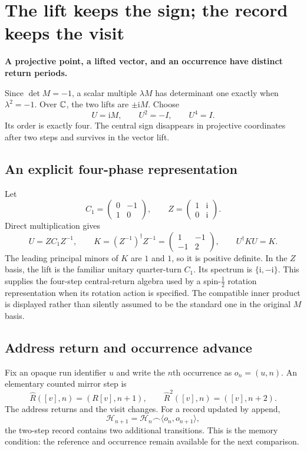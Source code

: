 \documentclass[11pt]{article}
\theoremstyle{definition}\newtheorem{definition}[theorem]{Definition}
\newcommand{\mi}{\mathrm i}\newcommand{\tr}{\mathsf T}
\newcommand{\lead}[1]{\textbf{#1}\par}
\newcommand{\page}{\clearpage}
\begin{document}
\page
\section{The lift keeps the sign; the record keeps the visit}
\lead{A projective point, a lifted vector, and an occurrence have distinct return periods.}
Since $\det M=-1$, a scalar multiple $\lambda M$ has determinant one exactly when $\lambda^2=-1$. Over $\mathbb C$, the two lifts are $\pm\mi M$. Choose
\begin{equation}
 U=\mi M,\qquad U^2=-I,\qquad U^4=I.
 \label{eq:lift}
\end{equation}
Its order is exactly four. The central sign disappears in projective coordinates after two steps and survives in the vector lift.

\subsection{An explicit four-phase representation}
Let
\begin{equation}
 C_1=\begin{pmatrix}0&-1\\1&0\end{pmatrix},\qquad
 Z=\begin{pmatrix}1&\mi\\0&\mi\end{pmatrix}.
\end{equation}
Direct multiplication gives
\begin{equation}
 U=ZC_1Z^{-1},\qquad
 K=(Z^{-1})^\dagger Z^{-1}=\begin{pmatrix}1&-1\\-1&2\end{pmatrix},
 \qquad U^\dagger K U=K.
 \label{eq:unitary}
\end{equation}
The leading principal minors of $K$ are $1$ and $1$, so it is positive definite. In the $Z$ basis, the lift is the familiar unitary quarter-turn $C_1$. Its spectrum is $\{\mi,-\mi\}$. This supplies the four-step central-return algebra used by a spin-$\tfrac12$ rotation representation when its rotation action is specified. The compatible inner product is displayed rather than silently assumed to be the standard one in the original $M$ basis.

\subsection{Address return and occurrence advance}
Fix an opaque run identifier $u$ and write the $n$th occurrence as $o_n=(u,n)$. An elementary counted mirror step is
\begin{equation}
 \widehat R([v],n)=(R[v],n+1),\qquad
 \widehat R^2([v],n)=([v],n+2).
 \label{eq:countedmirror}
\end{equation}
The address returns and the visit changes. For a record updated by append,
\begin{equation}
 \mathcal H_{n+1}=\mathcal H_n\frown\langle o_n,o_{n+1}\rangle,
 \label{eq:history}
\end{equation}
the two-step record contains two additional transitions. This is the memory condition: the reference and occurrence remain available for the next comparison.
\end{document}
